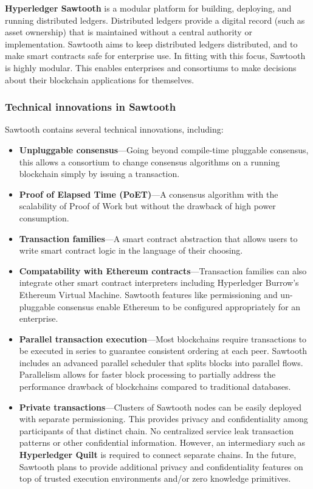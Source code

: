 \textbf{Hyperledger Sawtooth} is a modular platform for building, deploying, and running distributed ledgers. 
Distributed ledgers provide a digital record (such as asset ownership) that is maintained without a central authority or implementation. 
Sawtooth aims to keep distributed ledgers distributed, and to make smart contracts safe for enterprise use.
In fitting with this focus, Sawtooth is highly modular. 
This enables enterprises and consortiums to make decisions about their blockchain applications for themselves.

\subsubsection{Technical innovations in Sawtooth}
Sawtooth contains several technical innovations, including:
\begin{itemize}
\item \textbf{Unpluggable consensus}---Going beyond compile-time pluggable consensus, this allows a consortium to change consensus algorithms on a running blockchain simply by issuing a transaction.
\item \textbf{Proof of Elapsed Time (PoET)}---A consensus algorithm with the scalability of Proof of Work but without the drawback of high power consumption.
\item \textbf{Transaction families}---A smart contract abstraction that allows users to write smart contract logic in the language of their choosing.
\item \textbf{Compatability with Ethereum contracts}---Transaction families can also integrate other smart contract interpreters including Hyperledger Burrow's Ethereum Virtual Machine. 
Sawtooth features like permissioning and un-pluggable consensus enable Ethereum to be configured appropriately for an enterprise.
\item \textbf{Parallel transaction execution}---Most blockchains require transactions to be executed in series   to guarantee consistent ordering at each peer. 
Sawtooth includes an advanced parallel scheduler that splits blocks into parallel flows. 
Parallelism allows for faster block processing to partially address the performance drawback of blockchains compared to traditional databases.
\item \textbf{Private transactions}---Clusters of Sawtooth nodes can be easily deployed with separate permissioning. 
This provides privacy and confidentiality among participants of that distinct chain. 
No centralized service leak transaction patterns or other confidential information.
However, an intermediary such as \textbf{Hyperledger Quilt} is required to connect separate chains. 
In the future, Sawtooth plans to provide additional privacy and confidentiality features on top of trusted execution environments and/or zero knowledge primitives.
\end{itemize}

